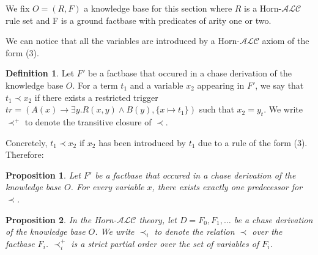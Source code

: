 \documentclass{article}
\newtheorem{proposition}{Proposition}[section]
\theoremstyle{definition}
\newtheorem{definition}{Definition}[section]
\theoremstyle{remark}
\begin{document}
We fix $O=(R,F)$ a knowledge base for this section where $R$ is a Horn-$\mathcal{ALC}$ rule set and F is a ground factbase with predicates of arity one or two.

We can notice that all the variables are introduced by a Horn-$\mathcal{ALC}$ axiom of the form (3).

\begin{definition}
Let $F'$ be a factbase that occured in a chase derivation of the knowledge base $O$. For a term $t_1$ and a variable $x_2$ appearing in $F'$, we say that $t_1 \prec x_2$ if there exists a restricted trigger $tr = (A(x) \rightarrow \exists y.R(x,y) \wedge B(y), \{x \mapsto t_1\})$ such that $x_2 = y_t$. We write $\prec^+$ to denote the transitive closure of $\prec$.
\end{definition}

Concretely, $t_1 \prec x_2$ if $x_2$ has been introduced by $t_1$ due to a rule of the form (3). Therefore:

\begin{proposition} \label{only one predecessor}
Let $F'$ be a factbase that occured in a chase derivation of the knowledge base $O$. For every variable $x$, there exists exactly one predecessor for $\prec$.
\end{proposition}


\begin{proposition} \label{partial_order}
In the Horn-$\mathcal{ALC}$ theory, let $D = F_0,F_1,\ldots$ be a chase derivation of the knowledge base $O$. We write $\prec_i$ to denote the relation $\prec$ over the factbase $F_i$. $\prec^+_i$ is a strict partial order over the set of variables of $F_i$.
\end{proposition}
\end{document}
